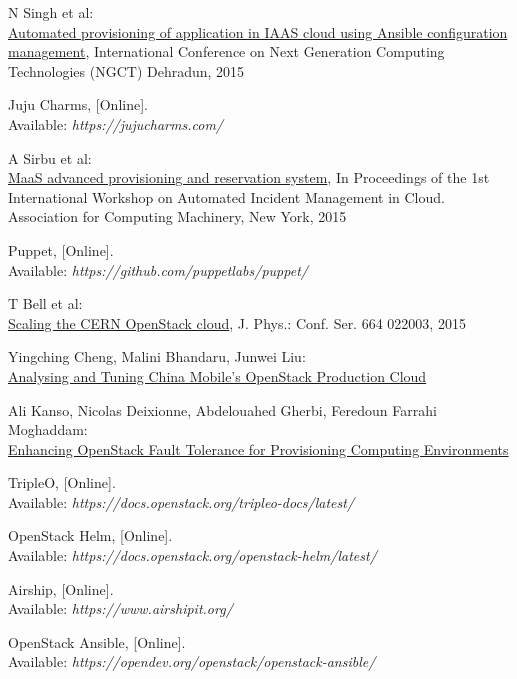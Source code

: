 \documentclass[officiallayout]{tktla}
\begin{document}
\begin{thebibliography}{9}
N Singh et al:
\\\href{https://ieeexplore.ieee.org/abstract/document/7375087}{Automated
provisioning of application in IAAS cloud using Ansible configuration management},
International Conference on Next Generation Computing Technologies (NGCT)
Dehradun, 2015

Juju Charms, [Online]. \\
Available: \textit{https://jujucharms.com/}

A Sirbu et al:
\\\href{https://dl.acm.org/doi/abs/10.1145/2747470.2747473}{MaaS advanced
provisioning and reservation system},
In Proceedings of the 1st International Workshop on Automated Incident
Management in Cloud. Association for Computing Machinery, New York, 2015

Puppet, [Online]. \\
Available: \textit{https://github.com/puppetlabs/puppet/}

T Bell et al:
\\\href{https://iopscience.iop.org/article/10.1088/1742-6596/664/2/022003/pdf}{
Scaling the CERN OpenStack cloud},
J. Phys.: Conf. Ser. 664 022003, 2015

Yingching Cheng, Malini Bhandaru, Junwei Liu:
\\\href{https://01.org/sites/default/files/performance_analysis_and_tuning_in_china_mobiles_openstack_production_cloud_2.pdf}{Analysing and Tuning China Mobile's OpenStack Production Cloud}

Ali Kanso, Nicolas Deixionne, Abdelouahed Gherbi, Feredoun Farrahi Moghaddam:
\\\href{https://ieeexplore.ieee.org/abstract/document/7911874}{Enhancing OpenStack Fault Tolerance for Provisioning Computing Environments}

TripleO, [Online]. \\
Available: \textit{https://docs.openstack.org/tripleo-docs/latest/}

OpenStack Helm, [Online]. \\
Available: \textit{https://docs.openstack.org/openstack-helm/latest/}

Airship, [Online]. \\
Available: \textit{https://www.airshipit.org/}

OpenStack Ansible, [Online]. \\
Available: \textit{https://opendev.org/openstack/openstack-ansible/}


\end{thebibliography}
\end{document}
